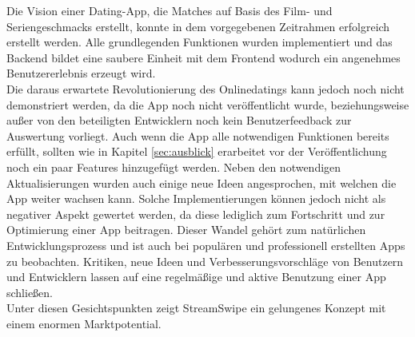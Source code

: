 Die Vision einer Dating-App, die Matches auf Basis des Film- und Seriengeschmacks erstellt, konnte in dem vorgegebenen Zeitrahmen erfolgreich erstellt werden. Alle grundlegenden Funktionen wurden implementiert und das Backend bildet eine saubere Einheit mit dem Frontend wodurch ein  angenehmes Benutzererlebnis erzeugt wird. \\
Die daraus erwartete Revolutionierung des Onlinedatings kann jedoch noch nicht demonstriert werden, da die App noch nicht veröffentlicht wurde, beziehungsweise außer von den beteiligten Entwicklern noch kein Benutzerfeedback zur Auswertung vorliegt. Auch wenn die App alle notwendigen Funktionen bereits erfüllt, sollten wie in Kapitel \ref{sec:ausblick} erarbeitet vor der Veröffentlichung noch ein paar Features hinzugefügt werden. Neben den notwendigen Aktualisierungen wurden auch einige neue Ideen angesprochen, mit welchen die App weiter wachsen kann. Solche Implementierungen  können jedoch nicht als negativer Aspekt gewertet werden, da diese lediglich zum Fortschritt und zur Optimierung einer App beitragen. Dieser Wandel gehört zum natürlichen Entwicklungsprozess und ist auch bei populären und professionell erstellten Apps zu beobachten. Kritiken, neue Ideen und Verbesserungsvorschläge von Benutzern und Entwicklern lassen auf eine regelmäßige und aktive Benutzung einer App schließen.\\
Unter diesen Gesichtspunkten zeigt StreamSwipe ein gelungenes Konzept mit einem enormen Marktpotential. 
